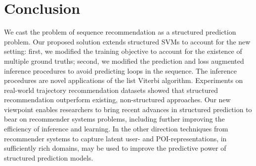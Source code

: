 
\section{Conclusion}

We cast the problem of sequence recommendation
as a structured prediction problem.
Our proposed solution extends structured SVMs to account for the new setting:
first, we modified the training objective to account for the existence of multiple ground truths;
second, we modified the prediction and loss augmented inference procedures to avoid predicting
loops in the sequence. The inference procedures are novel applications of the list Viterbi
algorithm.
Experiments on real-world trajectory recommendation datasets showed that
structured recommendation outperform existing, non-structured approaches.
Our new viewpoint enables researchers to bring recent advances in structured prediction
to bear on recommender systems problems,
including further improving the efficiency of inference and learning.
In the other direction techniques from recommender systems to capture latent
user- and POI-representations, in sufficiently rich domains, may be used to
improve the predictive power of structured prediction models.
